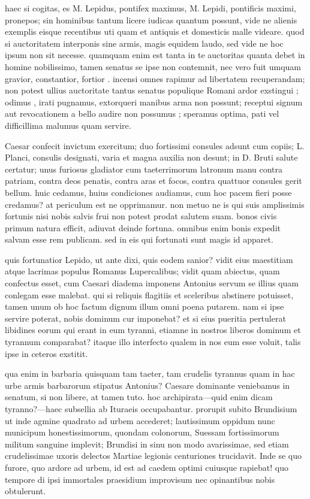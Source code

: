  haec si cogitas, es M. Lepidus, pontifex maximus, M. Lepidi, pontificis maximi, pronepos; sin hominibus tantum licere iudicas quantum possunt, vide ne alienis exemplis eisque recentibus uti quam et antiquis et domesticis malle videare. quod si auctoritatem interponis sine armis, magis equidem laudo, sed vide ne hoc ipsum non sit necesse. quamquam enim est tanta in te auctoritas quanta debet in homine nobilissimo, tamen senatus se ipse non contemnit, nec vero fuit umquam gravior, constantior, fortior . incensi omnes rapimur ad libertatem recuperandam; non potest ullius auctoritate tantus senatus populique Romani ardor exstingui ; odimus , irati pugnamus, extorqueri manibus arma non possunt; receptui signum aut revocationem a bello audire non possumus ; speramus optima, pati vel difficillima malumus quam servire.

 Caesar confecit invictum exercitum; duo fortissimi consules adsunt cum copiis; L. Planci, consulis designati, varia et magna auxilia non desunt; in D. Bruti salute certatur; unus furiosus gladiator cum taeterrimorum latronum manu contra patriam, contra deos penatis, contra aras et focos, contra quattuor consules gerit bellum. huic cedamus, huius condiciones audiamus, cum hoc pacem fieri posse credamus? at periculum est ne opprimamur. non metuo ne is qui suis amplissimis fortunis nisi nobis salvis frui non potest prodat salutem suam. bonos civis primum natura efficit, adiuvat deinde fortuna. omnibus enim bonis expedit salvam esse rem publicam. sed in eis qui fortunati sunt magis id apparet.

 quis fortunatior Lepido, ut ante dixi, quis eodem sanior? vidit eius maestitiam atque lacrimas populus Romanus Lupercalibus; vidit quam abiectus, quam confectus esset, cum Caesari diadema imponens Antonius servum se illius quam conlegam esse malebat. qui si reliquis flagitiis et sceleribus abstinere potuisset, tamen unum ob hoc factum dignum illum omni poena putarem. nam si ipse servire poterat, nobis dominum cur imponebat? et si eius pueritia pertulerat libidines eorum qui erant in eum tyranni, etiamne in nostros liberos dominum et tyrannum comparabat? itaque illo interfecto qualem in nos eum esse voluit, talis ipse in ceteros exstitit.

 qua enim in barbaria quisquam tam taeter, tam crudelis tyrannus quam in hac urbe armis barbarorum stipatus Antonius? Caesare dominante veniebamus in senatum, si non libere, at tamen tuto. hoc archipirata—quid enim dicam tyranno?—haec subsellia ab Ituraeis occupabantur. prorupit subito Brundisium ut inde agmine quadrato ad urbem accederet; lautissimum oppidum nunc municipum honestissimorum, quondam colonorum, Suessam fortissimorum militum sanguine implevit; Brundisi in sinu non modo avarissimae, sed etiam crudelissimae uxoris delectos Martiae legionis centuriones trucidavit. Inde se quo furore, quo ardore ad urbem, id est ad caedem optimi cuiusque rapiebat! quo tempore di ipsi immortales praesidium improvisum nec opinantibus nobis obtulerunt.

